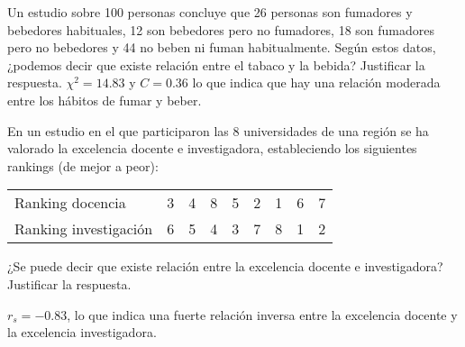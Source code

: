 {Un estudio sobre 100 personas concluye que 26 personas son fumadores y bebedores habituales, 12 son bebedores pero no
fumadores, 18 son fumadores pero no bebedores y 44 no beben ni fuman habitualmente. Según estos datos, ¿podemos decir
que existe relación entre el tabaco y la bebida? Justificar la respuesta.
}
{$\chi^2=14.83$ y $C=0.36$ lo que indica que hay una relación moderada entre los hábitos de fumar y beber.}
{}


{En un estudio en el que participaron las 8 universidades de una región se ha valorado la excelencia docente e
investigadora, estableciendo los siguientes rankings (de mejor a peor):
\begin{center}
\begin{tabular}{lcccccccc}
Ranking docencia & 3 & 4 & 8 & 5 & 2 & 1 & 6 & 7\\
Ranking investigación & 6 & 5 & 4 & 3 & 7 & 8 & 1 & 2\\
\end{tabular}
\end{center}
¿Se puede decir que existe relación entre la excelencia docente e investigadora? Justificar la respuesta.
}
{$r_s=-0.83$, lo que indica una fuerte relación inversa entre la excelencia docente y la excelencia investigadora.}
{}


